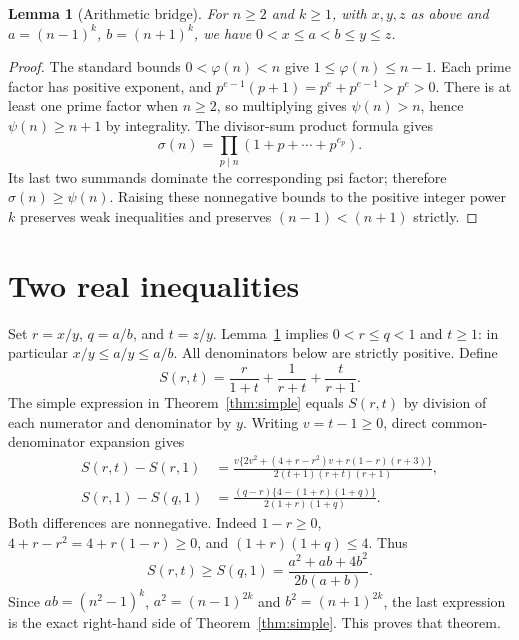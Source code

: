 \documentclass[11pt]{article}
\newtheorem{lemma}{Lemma}
\begin{document}
\begin{lemma}[Arithmetic bridge]\label{lem:bridge}
For $n\geq2$ and $k\geq1$, with $x,y,z$ as above and
$a=(n-1)^k$, $b=(n+1)^k$, we have
$0<x\leq a<b\leq y\leq z$.
\end{lemma}
\begin{proof}
The standard bounds $0<\varphi(n)<n$ give
$1\leq\varphi(n)\leq n-1$. Each prime factor has positive exponent,
and $p^{e-1}(p+1)=p^e+p^{e-1}>p^e>0$.
There is at least one prime factor when $n\geq2$, so multiplying gives
$\psi(n)>n$, hence $\psi(n)\geq n+1$ by integrality.
The divisor-sum product formula gives
\[
\sigma(n)=\prod_{p\mid n}(1+p+\cdots+p^{e_p}).
\]
Its last two summands dominate the corresponding psi factor;
therefore $\sigma(n)\geq\psi(n)$.
Raising these nonnegative bounds to the positive integer power $k$
preserves weak inequalities and preserves $(n-1)<(n+1)$ strictly.
\end{proof}

\section{Two real inequalities}
Set $r=x/y$, $q=a/b$, and $t=z/y$. Lemma~\ref{lem:bridge} implies
$0<r\leq q<1$ and $t\geq1$: in particular
$x/y\leq a/y\leq a/b$. All denominators below are strictly positive.
Define
\[
 S(r,t)=\frac r{1+t}+\frac1{r+t}+\frac t{r+1}.
\]
The simple expression in Theorem~\ref{thm:simple} equals $S(r,t)$
by division of each numerator and denominator by $y$.
Writing $v=t-1\geq0$, direct common-denominator expansion gives
\begin{align*}
 S(r,t)-S(r,1)
 &=\frac{v\{2v^2+(4+r-r^2)v+r(1-r)(r+3)\}}
 {2(t+1)(r+t)(r+1)},\\
 S(r,1)-S(q,1)
 &=\frac{(q-r)\{4-(1+r)(1+q)\}}{2(1+r)(1+q)}.
\end{align*}
Both differences are nonnegative. Indeed $1-r\geq0$,
$4+r-r^2=4+r(1-r)\geq0$, and
$(1+r)(1+q)\leq4$. Thus
\[
 S(r,t)\geq S(q,1)=\frac{a^2+ab+4b^2}{2b(a+b)}.
\]
Since $ab=(n^2-1)^k$, $a^2=(n-1)^{2k}$ and
$b^2=(n+1)^{2k}$, the last expression is the exact right-hand side of
Theorem~\ref{thm:simple}. This proves that theorem.
\end{document}
